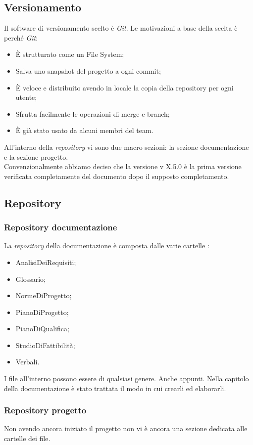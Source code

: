 \documentclass[12pt,a4paper,titlepage]{article}
\begin{document}
\subsection{Versionamento}
Il software di versionamento scelto è \textit{Git}. Le motivazioni a base della scelta è perché \textit{Git}:
\begin{itemize}
	\item È strutturato come un File System;
	\item Salva uno snapshot del progetto a ogni commit;
	\item È veloce e distribuito avendo in locale la copia della repository per ogni utente;
	\item Sfrutta facilmente le operazioni di merge e branch;
	\item È già stato usato da alcuni membri del team.
\end{itemize}
All'interno della \textit{repository} vi sono due macro sezioni: la sezione documentazione e la sezione progetto.\\
Convenzionalmente abbiamo deciso che la versione v X.5.0 è la prima versione verificata completamente del documento dopo il supposto completamento. 

\newpage

\subsection{Repository}
\subsubsection{Repository documentazione}
La \textit{repository} della documentazione è composta dalle varie cartelle :
\begin{itemize}
	\item AnalisiDeiRequisiti;
	\item Glossario;
	\item NormeDiProgetto;
	\item PianoDiProgetto;
	\item PianoDiQualifica;
	\item StudioDiFattibilità;
	\item Verbali.
\end{itemize}
I file all'interno possono essere di qualsiasi genere. Anche appunti. Nella capitolo della documentazione è stato trattata il modo in cui crearli ed elaborarli.

\subsubsection{Repository progetto}
Non avendo ancora iniziato il progetto non vi è ancora una sezione dedicata alle cartelle dei file.\\
\end{document}
